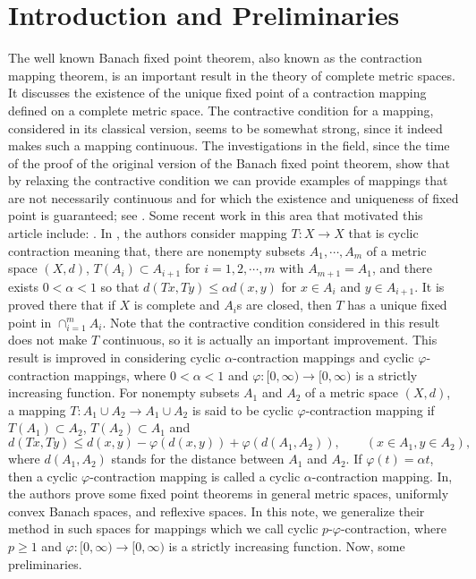 \documentclass{amsart}
\theoremstyle{definition}
\theoremstyle{remark}
\begin{document}
\section{Introduction  and Preliminaries}
The well known Banach fixed point theorem, also known as the contraction mapping theorem, is an important result in the theory of complete metric spaces. It discusses the existence of the unique fixed point of a contraction mapping defined on a complete metric space. The contractive condition for a mapping, considered in its classical version, seems to be somewhat strong, since it indeed makes such a mapping continuous. The investigations in the field, since the time of the proof of the original version of the Banach fixed point theorem, show that by relaxing the contractive condition we can provide examples of mappings that are not necessarily continuous and for which the existence and uniqueness of fixed point is guaranteed; see \cite{Ki}. Some recent work in this area that motivated this article include: \cite{ThSh,ElVe,KiSrVe}. In \cite{KiSrVe}, the authors consider mapping $T:X\to X$ that is cyclic contraction meaning that, there are nonempty subsets $A_1,\cdots,A_m$ of a metric space $(X,d)$, $T(A_i)\subset A_{i+1}$ for $i=1,2,\cdots,m$ with $A_{m+1}=A_1$, and there exists $0<\alpha<1$ so that $d(Tx,Ty)\leq\alpha d(x,y)$ for $x\in A_i$ and $y\in A_{i+1}$. It is proved there that if $X$ is complete and $A_i$s are closed, then $T$ has a unique fixed point in $\cap_{i=1}^mA_i$. Note that the contractive condition considered in this result does not make $T$ continuous, so it is actually an important improvement. This result is improved in \cite{ThSh,ElVe} considering cyclic $\alpha$-contraction mappings and cyclic $\varphi$-contraction mappings, where $0<\alpha<1$ and $\varphi:[0,\infty)\to[0,\infty)$ is a strictly increasing function. For nonempty subsets $A_1$ and $A_2$ of a metric space $(X,d)$, a mapping $T:A_1\cup A_2\to A_1\cup A_2$ is said to be cyclic $\varphi$-contraction mapping if $T(A_1)\subset A_2$, $T(A_2)\subset A_1$ and $$d(Tx,Ty)\leq d(x,y)-\varphi(d(x,y))+\varphi(d(A_1,A_2)),\qquad(x\in A_1,y\in A_2),$$ where $d(A_1,A_2)$ stands for the distance between $A_1$ and $A_2$. If $\varphi(t)=\alpha t$, then a cyclic $\varphi$-contraction mapping is called a cyclic $\alpha$-contraction mapping. In\cite{ThSh,ElVe}, the authors prove some fixed point theorems in general metric spaces, uniformly convex Banach spaces, and reflexive spaces. In this note, we generalize their method in such spaces for mappings which we call cyclic $p$-$\varphi$-contraction, where $p\geq1$ and $\varphi:[0,\infty)\to[0,\infty)$ is a strictly increasing function. Now, some preliminaries.
\end{document}
